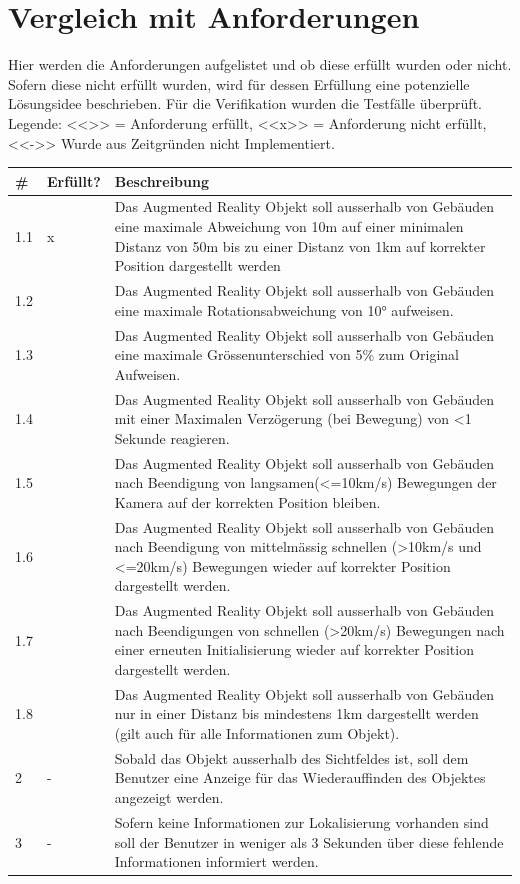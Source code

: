 \documentclass[a4paper]{scrreprt}
\begin{document}
\section{Vergleich mit Anforderungen}
Hier werden die Anforderungen aufgelistet und ob diese erfüllt wurden oder nicht. Sofern diese nicht erfüllt wurden, wird für dessen Erfüllung eine potenzielle Lösungsidee beschrieben. Für die Verifikation wurden die Testfälle überprüft.
\bigbreak
Legende:
<<\checkmark >> = Anforderung erfüllt, <<x>> = Anforderung nicht erfüllt, <<->> Wurde aus Zeitgründen nicht Implementiert.

\begin{tabularx}{\textwidth}{l l X}
\hline
	\# & \textbf{Erfüllt?} & \textbf{Beschreibung} \\
\hline
	1.1 & x & Das Augmented Reality Objekt soll ausserhalb von Gebäuden eine maximale Abweichung von 10m auf einer minimalen Distanz von 50m bis zu einer Distanz von 1km auf korrekter Position dargestellt werden \\
\hline
	1.2 & \checkmark & Das Augmented Reality Objekt soll ausserhalb von Gebäuden eine maximale Rotationsabweichung von \ang{10} aufweisen.\\
\hline
	1.3 & \checkmark & Das Augmented Reality Objekt soll ausserhalb von Gebäuden eine maximale Grössenunterschied von 5\% zum Original Aufweisen.\\
\hline
	1.4 & \checkmark & Das Augmented Reality Objekt soll ausserhalb von Gebäuden mit einer Maximalen Verzögerung (bei Bewegung) von <1 Sekunde reagieren.\\
\hline
	1.5 & \checkmark & Das Augmented Reality Objekt soll ausserhalb von Gebäuden nach Beendigung von langsamen(<=10km/s) Bewegungen der Kamera auf der korrekten Position bleiben.\\
\hline
	1.6 & \checkmark & Das Augmented Reality Objekt soll ausserhalb von Gebäuden nach Beendigung von mittelmässig schnellen (>10km/s und <=20km/s) Bewegungen wieder auf korrekter Position dargestellt werden.\\
\hline
	1.7 & \checkmark & Das Augmented Reality Objekt soll ausserhalb von Gebäuden nach Beendigungen von schnellen (>20km/s) Bewegungen nach einer erneuten Initialisierung wieder auf korrekter Position dargestellt werden.\\
\hline
	1.8 & \checkmark & Das Augmented Reality Objekt soll ausserhalb von Gebäuden nur in einer Distanz bis mindestens 1km dargestellt werden (gilt auch für alle Informationen zum Objekt).\\
\hline
	2 & - & Sobald das Objekt ausserhalb des Sichtfeldes ist, soll dem Benutzer eine Anzeige für das Wiederauffinden des Objektes angezeigt werden.\\
\hline
	3 & - & Sofern keine Informationen zur Lokalisierung vorhanden sind soll der Benutzer in weniger als 3 Sekunden über diese fehlende Informationen informiert werden. \\
\hline
\end{tabularx}
\end{document}

